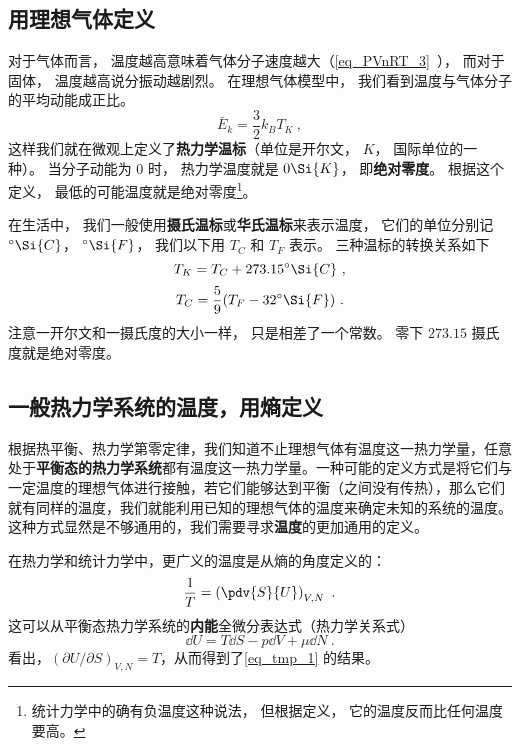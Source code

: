 

\subsection{用理想气体定义}
对于气体而言， 温度越高意味着气体分子速度越大（\autoref{eq_PVnRT_3}~）， 而对于固体， 温度越高说分振动越剧烈。 在理想气体模型中， 我们看到温度与气体分子的平均动能成正比。 
\begin{equation}
\bar E_k = \frac{3}{2} k_B T_K~,
\end{equation}
这样我们就在微观上定义了\textbf{热力学温标}（单位是开尔文， $K$， 国际单位的一种）。 当分子动能为 0 时， 热力学温度就是 $0 \Si{K}$， 即\textbf{绝对零度}。 根据这个定义， 最低的可能温度就是绝对零度\footnote{统计力学中的确有负温度这种说法， 但根据定义， 它的温度反而比任何温度要高。}。

在生活中， 我们一般使用\textbf{摄氏温标}或\textbf{华氏温标}来表示温度， 它们的单位分别记 $^\circ\Si{C}$， $^\circ\Si{F}$， 我们以下用 $T_C$ 和 $T_F$ 表示。 三种温标的转换关系如下
\begin{equation}
T_K = T_C + 273.15^\circ\Si{C}~,
\end{equation}
\begin{equation}
T_C = \frac{5}{9}(T_F - 32^\circ\Si{F})~.
\end{equation}
注意一开尔文和一摄氏度的大小一样， 只是相差了一个常数。 零下 $273.15$ 摄氏度就是绝对零度。

\subsection{一般热力学系统的温度，用熵定义}
根据热平衡、热力学第零定律，我们知道不止理想气体有温度这一热力学量，任意处于\textbf{平衡态的热力学系统}都有温度这一热力学量。一种可能的定义方式是将它们与一定温度的理想气体进行接触，若它们能够达到平衡（之间没有传热），那么它们就有同样的温度，我们就能利用已知的理想气体的温度来确定未知的系统的温度。这种方式显然是不够通用的，我们需要寻求\textbf{温度}的更加通用的定义。

在热力学和统计力学中，更广义的温度是从熵的角度定义的：
\begin{equation}\label{eq_tmp_1}
\frac{1}{T} = \left(\pdv{S}{U}\right)_{V,N} ~.
\end{equation}
这可以从平衡态热力学系统的\textbf{内能}全微分表达式（热力学关系式）
\begin{equation}
\dd U=T\dd S-p\dd V+\mu \dd N~.
\end{equation}
看出，$(\partial U/\partial S)_{V,N}=T$，从而得到了\autoref{eq_tmp_1} 的结果。

